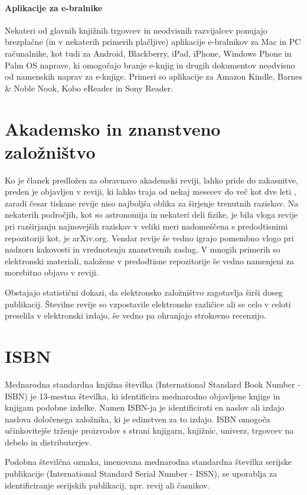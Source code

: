 \documentclass[a4paper, 12pt]{book}
\begin{document}
\paragraph{Aplikacije za e-bralnike}
Nekateri od glavnih knjižnih trgovcev in neodvisnih razvijalcev ponujajo brezplačne (in v nekaterih primerih plačljive) aplikacije e-bralnikov za Mac in PC računalnike, kot tudi za Android, Blackberry, iPad, iPhone, Windows Phone in Palm OS naprave, ki omogočajo branje e-knjig in drugih dokumentov neodvisno od namenskih naprav za e-knjige. Primeri so aplikacije za Amazon Kindle, Barnes \& Noble Nook, Kobo eReader in Sony Reader. 


\section{Akademsko in znanstveno založništvo}
\label{akademsko_z}
Ko je članek predložen za obravnavo akademski reviji, lahko pride do zakasnitve, preden je objavljen v reviji, ki lahko traja od nekaj mesecev do več kot dve leti \cite{40}, zaradi česar tiskane revije niso najboljša oblika za širjenje trenutnih raziskav. Na nekaterih področjih, kot so astronomija in nekateri deli fizike, je bila vloga revije pri razširjanju najnovejših raziskav v veliki meri nadomeščena s predodtisnimi repozitoriji kot, je arXiv.org. \cite{109} Vendar revije še vedno igrajo pomembno vlogo pri nadzoru kakovosti in vrednotenju znanstvenih zaslug. V mnogih primerih so elektronski materiali, naložene v predodtisne repozitorije še vedno namenjeni za morebitno objavo v reviji.

Obstajajo statistični dokazi, da elektronsko založništvo zagotavlja širši doseg publikacij. \cite{41} Številne revije so vzpostavile elektronske različice ali se celo v celoti preselila v elektronski izdajo, še vedno pa ohranjajo strokovno recenzijo.

\section{ISBN}
Mednarodna standardna knjižna številka (International Standard Book Number - ISBN) je 13-mestna številka, ki identificira mednarodno objavljene knjige in knjigam podobne izdelke. Namen ISBN-ja je identificirati en naslov ali izdajo naslova določenega založnika, ki je edinstven za to izdajo. ISBN omogoča učinkovitejše trženje proizvodov s strani knjigarn, knjižnic, univerz, trgovcev na debelo in distributerjev. 

Podobna številčna oznaka, imenovana mednarodna standardna številka serijske publikacije (International Standard Serial Number - ISSN), se uporablja za identificiranje serijskih publikacij, npr. revij ali časnikov. 
\end{document}
